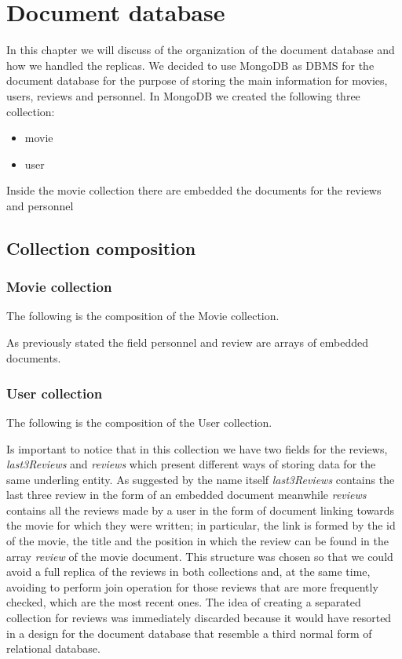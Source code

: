 %
%
\chapter{Document database}
\justifying
In this chapter we will discuss of the organization of the document database and how we handled the replicas. We decided to use MongoDB as DBMS for the document database for the purpose of storing the main information for movies, users, reviews and personnel. In MongoDB we created the following three collection: 
\begin{itemize}
	\item movie
	\item user
\end{itemize}
Inside the movie collection there are embedded the documents for the reviews and personnel
\section{Collection composition}
\subsection{Movie collection}
The following is the composition of the Movie collection.

As previously stated the field personnel and review are arrays of embedded documents.
\paragraph{}
\subsection{User collection}
The following is the composition of the User collection.

Is important to notice that in this collection we have two fields for the reviews, \emph{last3Reviews} and \emph{reviews} which present different ways of storing data for the same underling entity. As suggested by the name itself \emph{last3Reviews} contains the last three review in the form of an embedded document meanwhile \emph{reviews} contains all the reviews made by a user in the form of document linking towards the movie for which they were written; in particular, the link is formed by the id of the movie, the title and the position in which the review can be found in the array \emph{review} of the movie document. This structure was chosen so that we could avoid a full replica of the reviews in both collections and, at the same time, avoiding to perform join operation for those reviews that are more frequently checked, which are the most recent ones. The idea of creating a separated collection for reviews was immediately discarded because it would have resorted in a design for the document database that resemble a third normal form of relational database.

